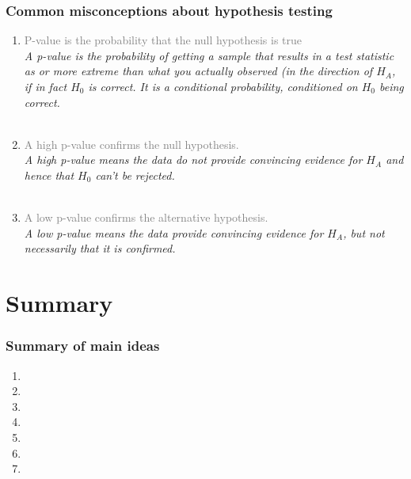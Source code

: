 \documentclass[slidestop,compress,mathserif,12pt,t,professionalfonts,xcolor=table]{beamer}
\begin{document}
\begin{frame}
\frametitle{Common misconceptions about hypothesis testing}

\begin{enumerate}

\item \textcolor{gray}{P-value is the probability that the null hypothesis is true} \\
\textit{A p-value is the probability of getting a sample that results in a test statistic as or more extreme than what you actually observed (in the direction of $H_A$, if in fact $H_0$ is correct. It is a conditional probability, conditioned on $H_0$ being correct.} \\
$\:$ \\

\pause

\item  \textcolor{gray}{A high p-value confirms the null hypothesis.}\\
\textit{A high p-value means the data do not provide convincing evidence for $H_A$ and hence that $H_0$ can't be rejected.} \\
$\:$ \\

\pause

\item   \textcolor{gray}{A low p-value confirms the alternative hypothesis.} \\
\textit{A low p-value means the data provide convincing evidence for $H_A$, but not necessarily that it is confirmed.} \\

\end{enumerate}

\end{frame}


\section{Summary}


\begin{frame}
\frametitle{Summary of main ideas}

\vfill

\begin{enumerate}

\item {}

\item {}

\item {}

\item {}

\item {}

\item {}

\item {}

\end{enumerate}

\vfill

\end{frame}

\end{document}
